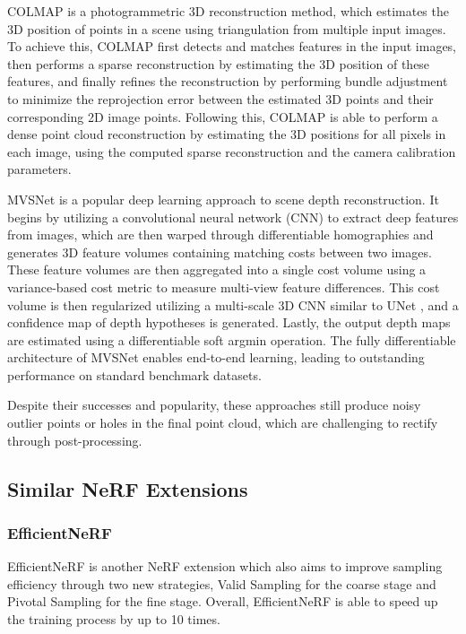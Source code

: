 \documentclass[10pt,twocolumn,letterpaper]{article}
\begin{document}
COLMAP \cite{COLMAP} is a photogrammetric 3D reconstruction method, which estimates the 3D position of points in a scene using triangulation from multiple input images. To achieve this, COLMAP first detects and matches features in the input images, then performs a sparse reconstruction by estimating the 3D position of these features, and finally refines the reconstruction by performing bundle adjustment to minimize the reprojection error between the estimated 3D points and their corresponding 2D image points. Following this, COLMAP is able to perform a dense point cloud reconstruction by estimating the 3D positions for all pixels in each image, using the computed sparse reconstruction and the camera calibration parameters.

MVSNet \cite{MVSNet} is a popular deep learning approach to scene depth reconstruction. It begins by utilizing a convolutional neural network (CNN) to extract deep features from images, which are then warped through differentiable homographies and generates 3D feature volumes containing matching costs between two images. These feature volumes are then aggregated into a single cost volume using a variance-based cost metric to measure multi-view feature differences. This cost volume is then regularized utilizing a multi-scale 3D CNN similar to UNet \cite{UNet}, and a confidence map of depth hypotheses is generated. Lastly, the output depth maps are estimated using a differentiable soft argmin operation. The fully differentiable architecture of MVSNet enables end-to-end learning, leading to outstanding performance on standard benchmark datasets.

Despite their successes and popularity, these approaches still produce noisy outlier points or holes in the final point cloud, which are challenging to rectify through post-processing.




\subsection{Similar NeRF Extensions}
\subsubsection{EfficientNeRF}
EfficientNeRF \cite{EfficientNeRF} is another NeRF extension which also aims to improve sampling efficiency through two new strategies, Valid Sampling for the coarse stage and Pivotal Sampling for the fine stage. Overall, EfficientNeRF is able to speed up the training process by up to 10 times.
\end{document}
